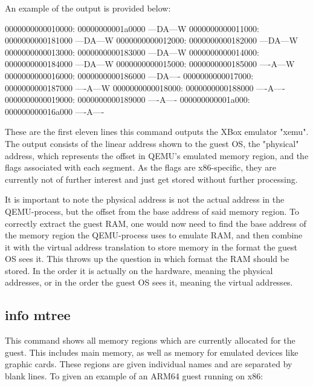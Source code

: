 An example of the output is provided below:

\begin{ffcode}
    0000000000010000: 00000000001a0000 ---DA---W
    0000000000011000: 0000000000181000 ---DA---W
    0000000000012000: 0000000000182000 ---DA---W
    0000000000013000: 0000000000183000 ---DA---W
    0000000000014000: 0000000000184000 ---DA---W
    0000000000015000: 0000000000185000 ----A---W
    0000000000016000: 0000000000186000 ---DA----
    0000000000017000: 0000000000187000 ----A---W
    0000000000018000: 0000000000188000 ----A----
    0000000000019000: 0000000000189000 ----A----
    000000000001a000: 000000000016a000 ----A----
\end{ffcode}

These are the first eleven lines this command outputs the XBox emulator "xemu"\cite{xemu}.
The output consists of the linear address shown to the guest OS, the "physical" address, which represents the offset in QEMU's emulated memory region,
and the flags associated with each segment.
As the flags are x86-specific, they are currently not of further interest and just get stored without further processing.

It is important to note the physical address is not the actual address in the QEMU-process, but the offset from the base address of said memory region.
To correctly extract the guest RAM, one would now need to find the base address of the memory region the QEMU-process uses to emulate RAM,
and then combine it with the virtual address translation to store memory in the format the guest OS sees it.
This throws up the question in which format the RAM should be stored. In the order it is actually on the hardware, meaning the physical addresses,
or in the order the guest OS sees it, meaning the virtual addresses.

\subsection{info mtree}
This command shows all memory regions which are currently allocated for the guest.
This includes main memory, as well as memory for emulated devices like graphic cards.
These regions are given individual names and are separated by blank lines.
To given an example of an ARM64 guest running on x86:


